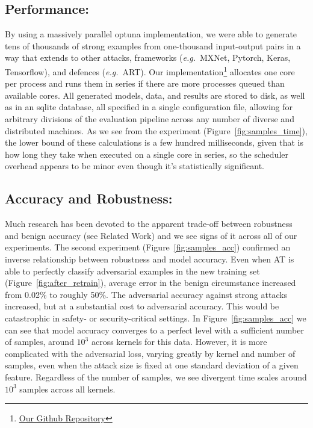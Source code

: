 \documentclass[fonts]{icst}
\begin{document}
\subsection{Performance: }
By using a massively parallel optuna \cite{optuna} implementation, we were able to generate tens of thousands of strong examples from one-thousand input-output pairs in a way that extends to other attacks, frameworks 
(\textit{e.g.}~MXNet, Pytorch, Keras, Tensorflow), and defences (\textit{e.g.}~ART). Our implementation\footnote{\href{https://github.com/simplymathematics/deckard/tree/main/examples/security}{Our Github Repository}} allocates one core per process and runs them in series if there are more processes queued than available cores. All generated models, data, and results are stored to disk, as well as in an sqlite database, all specified in a single configuration file, allowing for arbitrary divisions of the evaluation pipeline across any number of diverse and distributed machines. As we see from the experiment (Figure~\ref{fig:samples_time}), the lower bound of these calculations is a few hundred milliseconds, given that is how long they take when executed on a single core in series, so the scheduler overhead appears to be minor even though it's statistically significant.

\subsection{Accuracy and Robustness:}
Much research has been devoted to the apparent trade-off between robustness and benign accuracy (see Related Work) and we see signs of it across all of our experiments. The second experiment (Figure~\ref{fig:samples_acc}) confirmed an inverse relationship between robustness and model accuracy. Even when AT is able to perfectly classify adversarial examples in the new training set (Figure~\ref{fig:after_retrain}), average error in the benign circumstance increased from 0.02\% to roughly 50\%. The adversarial accuracy against strong attacks increased, but at a substantial cost to adversarial accuracy. This would be catastrophic in safety- or security-critical settings. In Figure~\ref{fig:samples_acc} we can see that model accuracy converges to a perfect level with a sufficient number of samples, around $10^3$ across kernels for this data. However, it is more complicated with the adversarial loss, varying greatly by kernel and number of samples, even when the attack size is fixed at one standard deviation of a given feature. Regardless of the number of samples, we see divergent time scales around $10^3$ samples across all kernels.
\end{document}
